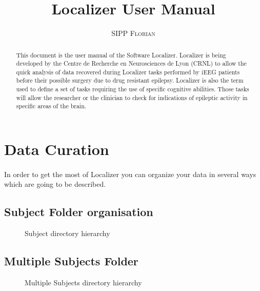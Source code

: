 \documentclass[a4paper]{article}
\title{Localizer User Manual}
\author{\textsc{SIPP Florian}}
\begin{document}
\maketitle
\begin{abstract}
This document is the user manual of the Software Localizer. Localizer is being developed by the Centre de Recherche en Neurosciences de Lyon (CRNL) to allow the quick analysis of data recovered during Localizer tasks performed by iEEG patients before their possible surgery due to drug resistant epilepsy.  Localizer is also the term used to define a set of tasks requiring the use of specific cognitive abilities. Those tasks will allow the researcher or the clinician to check for indications of epileptic activity in specific areas of the brain. 
\end{abstract}
\tableofcontents
\newpage
\section{Data Curation} \label{curation}    
\paragraph{} In order to get the most of Localizer you can organize your data in several ways which are going to be described.
\subsection{Subject Folder organisation}
\begin{figure}[H]
\caption{\label{SubjectDirectory}Subject directory hierarchy}
\end{figure}
\subsection{Multiple Subjects Folder}
\begin{figure}[H]
\caption{\label{MultipleSubjectsDirectory}Multiple Subjects directory hierarchy}
\end{figure}
\end{document}
